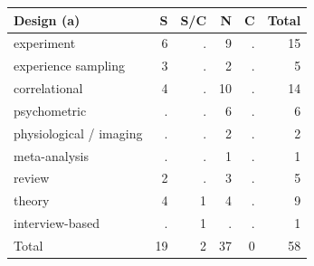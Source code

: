 \begin{center}\small
\begin{tabular}{@{}lrrrrr@{}}\toprule
Design (a) & S & S/C & N & C & Total \\ \midrule
experiment & 6 & . & 9 & . & 15 \\
experience sampling & 3 & . & 2 & . & 5 \\
correlational & 4 & . & 10 & . & 14 \\
psychometric & . & . & 6 & . & 6 \\
physiological / imaging & . & . & 2 & . & 2 \\
meta-analysis & . & . & 1 & . & 1 \\
review & 2 & . & 3 & . & 5 \\
theory & 4 & 1 & 4 & . & 9 \\
interview-based & . & 1 & . & . & 1 \\
\midrule Total & 19 & 2 & 37 & 0 & 58 \\
\bottomrule\end{tabular}\end{center}

